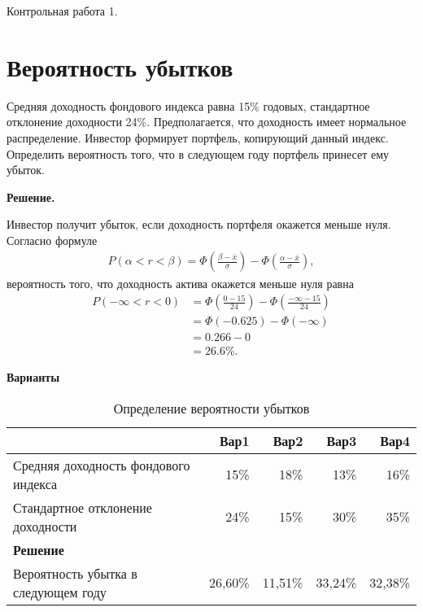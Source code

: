 \documentclass[12pt,a4paper]{article}
\begin{document}
\huge{Контрольная работа 1.}
\normalsize
\section{Вероятность убытков}
\begin{taskrus}
Средняя доходность фондового индекса равна 15\% годовых, стандартное отклонение доходности 24\%. Предполагается, что доходность имеет нормальное распределение. Инвестор формирует портфель, копирующий данный индекс. Определить вероятность того, что в следующем году портфель принесет ему убыток.

\textbf{Решение.}

Инвестор получит убыток, если доходность портфеля окажется меньше нуля. Согласно формуле 
\begin{align}
\label{prob_loss}
P(\alpha<r<\beta)=\Phi\left(\frac{\beta-\overline{x}}{\sigma}\right)-\Phi\left(\frac{\alpha-\overline{x}}{\sigma}\right),
\end{align}
вероятность того, что доходность актива окажется меньше нуля равна
\begin{align*}
P(-\infty<r<0)&=\Phi\left(\frac{0-15}{24}\right)-\Phi\left(\frac{-\infty-15}{24}\right)\\
&=\Phi(-0.625)-\Phi(-\infty)\\
&=0.266-0\\
&=26.6\%.
\end{align*}

\textbf{Варианты }
\begin{table}[htbp]
  \centering
  \caption{Определение вероятности убытков}
    \begin{tabular}{lrrrr}
    \toprule
          & Вар1  & Вар2  & Вар3  & Вар4 \\
    \midrule
    Средняя доходность фондового индекса & 15\%  & 18\%  & 13\%  & 16\% \\
    Стандартное отклонение доходности & 24\%  & 15\%  & 30\%  & 35\% \\
    \midrule
    \textbf{Решение} &       &       &       &  \\
    \midrule
    Вероятность убытка в следующем году & 26,60\% & 11,51\% & 33,24\% & 32,38\% \\
    \bottomrule
    \end{tabular}%
  \label{tab:addlabel}%
\end{table}%

\end{taskrus}
\end{document}
